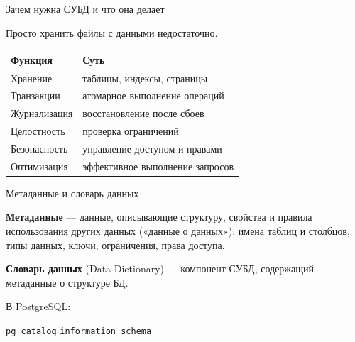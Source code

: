 \documentclass[aspectratio=169]{beamer}
\begin{document}
\begin{frame}{Зачем нужна СУБД и что она делает}

Просто хранить файлы с данными недостаточно.

\vspace{0.2cm}
\small
\begin{table}
\centering
\begin{tabular}{p{}|p{}}
\toprule
\textbf{Функция} & \textbf{Суть}\\
\midrule
Хранение & таблицы, индексы, страницы\\
Транзакции & атомарное выполнение операций\\
Журнализация & восстановление после сбоев\\
Целостность & проверка ограничений\\
Безопасность & управление доступом и правами\\
Оптимизация & эффективное выполнение запросов\\
\bottomrule
\end{tabular}
\end{table}

\end{frame}


\begin{frame}{Метаданные и словарь данных}

\textbf{Метаданные} — данные, описывающие структуру,
свойства и правила использования других данных
(«данные о данных»): имена таблиц и столбцов,
типы данных, ключи, ограничения, права доступа.

\vspace{0.4cm}

\textbf{Словарь данных} (Data Dictionary) —
компонент СУБД, содержащий метаданные о структуре БД.

\vspace{0.2cm}
В PostgreSQL:

\begin{center}
\texttt{pg\_catalog}
\qquad
\texttt{information\_schema}
\end{center}

\end{frame}


\end{document}
